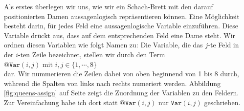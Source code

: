 Als erstes überlegen wir uns, wie wir ein Schach-Brett mit den darauf
positionierten Damen aussagenlogisch repräsentieren können.  Eine Möglichkeit besteht darin, 
für jedes Feld eine aussagenlogische Variable einzuführen.  Diese Variable drückt
aus, dass auf dem entsprechenden Feld eine Dame steht.  Wir ordnen diesen Variablen wie
folgt Namen zu:  Die Variable, die das $j$-te Feld in der $i$-ten
Zeile bezeichnet, stellen wir durch den Term 
\\[0.2cm]
\hspace*{1.3cm}
 $\texttt{@Var}(i,j)$ \quad mit $i,j \in \{1, \cdots, 8\}$ 
\\[0.2cm]
dar. Wir nummerieren die Zeilen dabei von oben beginnend von 1 bis 8 durch, während die
Spalten von links nach rechts numeriert werden.  Abbildung \ref{fig:queens-assign} auf
Seite \pageref{fig:queens-assign} zeigt die Zuordnung der Variablen zu den Feldern.  Zur
Vereinfachung habe ich dort statt $\texttt{@Var}(i,j)$ nur $\texttt{Var}(i,j)$ geschrieben.

